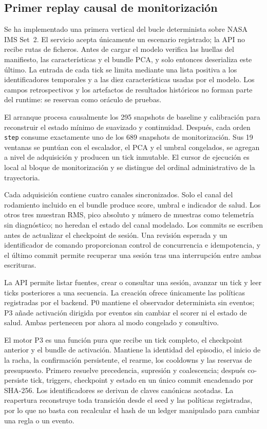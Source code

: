\subsection{Primer replay causal de monitorización}

Se ha implementado una primera vertical del bucle determinista sobre NASA IMS
Set~2. El servicio acepta únicamente un escenario registrado; la API no recibe
rutas de ficheros. Antes de cargar el modelo verifica las huellas del manifiesto,
las características y el bundle PCA, y solo entonces deserializa este último.
La entrada de cada tick se limita mediante una lista positiva a los
identificadores temporales y a las diez características usadas por el modelo.
Los campos retrospectivos y los artefactos de resultados históricos no forman
parte del runtime: se reservan como oráculo de pruebas.

El arranque procesa causalmente los 295 snapshots de baseline y calibración
para reconstruir el estado mínimo de suavizado y continuidad. Después, cada
orden \texttt{step} consume exactamente uno de los 689 snapshots de
monitorización. Sus 19 ventanas se puntúan con el escalador, el PCA y el umbral
congelados, se agregan a nivel de adquisición y producen un tick inmutable. El
cursor de ejecución es local al bloque de monitorización y se distingue del
ordinal administrativo de la trayectoria.

Cada adquisición contiene cuatro canales sincronizados. Solo el canal del
rodamiento incluido en el bundle produce score, umbral e indicador de salud.
Los otros tres muestran RMS, pico absoluto y número de muestras como telemetría
sin diagnóstico; no heredan el estado del canal modelado. Los commits se
escriben antes de actualizar el checkpoint de sesión. Una revisión esperada y
un identificador de comando proporcionan control de concurrencia e
idempotencia, y el último commit permite recuperar una sesión tras una
interrupción entre ambas escrituras.

La API permite listar fuentes, crear o consultar una sesión, avanzar un tick y
leer ticks posteriores a una secuencia. La creación ofrece únicamente las
políticas registradas por el backend. P0 mantiene el observador determinista sin
eventos; P3 añade activación dirigida por eventos sin cambiar el scorer ni el
estado de salud. Ambas pertenecen por ahora al modo congelado y consultivo.

El motor P3 es una función pura que recibe un tick completo, el checkpoint
anterior y el bundle de activación. Mantiene la identidad del episodio, el
inicio de la racha, la confirmación persistente, el rearme, los cooldowns y las
reservas de presupuesto. Primero resuelve precedencia, supresión y coalescencia;
después co-persiste tick, triggers, checkpoint y estado en un único commit
encadenado por SHA-256. Los identificadores se derivan de claves canónicas
acotadas. La reapertura reconstruye toda transición desde el seed y las
políticas registradas, por lo que no basta con recalcular el hash de un ledger
manipulado para cambiar una regla o un evento.

